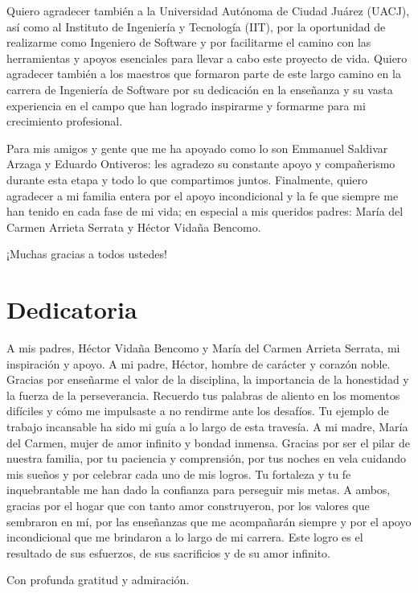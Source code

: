 \documentclass[final, fmstyle, 12pt]{article}
\begin{document}
Quiero agradecer también a la Universidad Autónoma de Ciudad Juárez (UACJ), así como al Instituto de Ingeniería y Tecnología (IIT), por la oportunidad de realizarme como Ingeniero de Software y por facilitarme el camino con las herramientas y apoyos esenciales para llevar a cabo este proyecto de vida.
Quiero agradecer también a los maestros que formaron parte de este largo camino en la carrera de Ingeniería de Software por su dedicación en la enseñanza y su vasta experiencia en el campo que han logrado inspirarme y formarme para mi crecimiento profesional.

Para mis amigos y gente que me ha apoyado como lo son Emmanuel Saldivar Arzaga y Eduardo Ontiveros: les agradezo su constante apoyo y compañerismo durante esta etapa y todo lo que compartimos juntos.
Finalmente, quiero agradecer a mi familia entera por el apoyo incondicional y la fe que siempre me han tenido en cada fase de mi vida; en especial a mis queridos padres: María del Carmen Arrieta Serrata y Héctor Vidaña Bencomo.




¡Muchas gracias a todos ustedes!
\newpage
\section*{Dedicatoria}
\setlength{\parskip}{1em}
A mis padres, Héctor Vidaña Bencomo y María del Carmen Arrieta Serrata, mi inspiración y apoyo.
A mi padre, Héctor, hombre de carácter y corazón noble. Gracias por enseñarme el valor de la disciplina, la importancia de la honestidad y la fuerza de la perseverancia. Recuerdo tus palabras de aliento en los momentos difíciles y cómo me impulsaste a no rendirme ante los desafíos. Tu ejemplo de trabajo incansable ha sido mi guía a lo largo de esta travesía.
A mi madre, María del Carmen, mujer de  amor infinito y  bondad inmensa. Gracias por ser el pilar de nuestra familia, por tu paciencia y comprensión, por tus noches en vela cuidando mis sueños y por celebrar cada uno de mis logros.  Tu fortaleza y tu fe inquebrantable me han dado la confianza para perseguir mis metas.
A ambos, gracias por el hogar que con tanto amor construyeron, por los valores que sembraron en mí, por las enseñanzas que me acompañarán siempre y por el apoyo incondicional que me brindaron a lo largo de mi carrera. Este logro es el resultado de sus esfuerzos, de sus sacrificios y de su amor infinito.


Con profunda gratitud y admiración.
\newpage
\tableofcontents
\listoffigures
\end{document}
